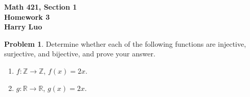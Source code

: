 \documentclass[12pt]{article}
\theoremstyle{definition}\newtheorem{problem}{Problem}
\newcommand{\Z}{\mathbb{Z}}
\newcommand{\R}{\mathbb{R}}
\begin{document}

\begin{center}
\bfseries Math 421, Section 1 
\\ 
Homework 3
\\ 
Harry Luo %
\\ [24pt] 
\end{center}

\begin{problem}
Determine whether each of the following functions are injective, surjective, and bijective, and prove your answer.
\begin{enumerate}
\item $f:\Z\to\Z$, $f(x) = 2x$.  %
\item $g:\R\to\R$, $g(x) = 2x$.  %
\end{enumerate}
\end{problem}
\end{document}
